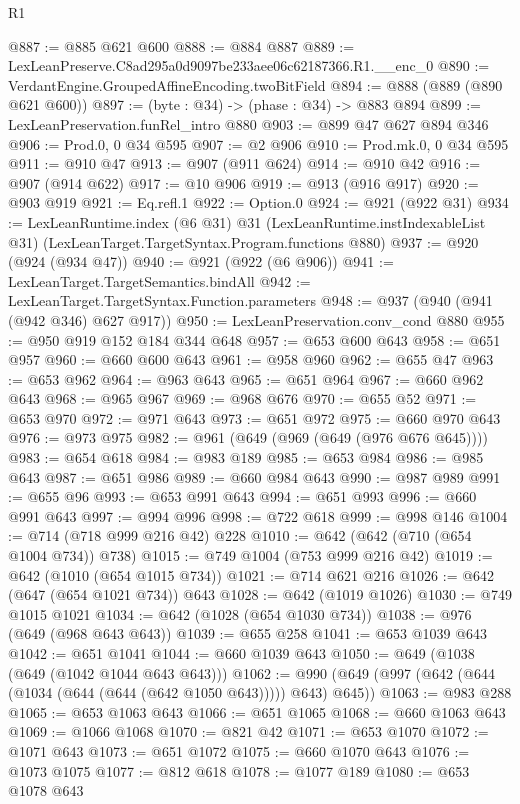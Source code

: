 \begin{lexlean}{R1}
\begin{coremodule}
@887 := @885 @621 @600
@888 := @884 @887
@889 := LexLeanPreserve.C8ad295a0d9097be233aee06c62187366.R1.__enc_0
@890 := VerdantEngine.GroupedAffineEncoding.twoBitField
@894 := @888 (@889 (@890 @621 @600))
@897 := (byte : @34) -> (phase : @34) -> @883 @894
@899 := LexLeanPreservation.funRel_intro @880
@903 := @899 @47 @627 @894 @346
@906 := Prod.{0, 0} @34 @595
@907 := @2 @906
@910 := Prod.mk.{0, 0} @34 @595
@911 := @910 @47
@913 := @907 (@911 @624)
@914 := @910 @42
@916 := @907 (@914 @622)
@917 := @10 @906
@919 := @913 (@916 @917)
@920 := @903 @919
@921 := Eq.refl.{1}
@922 := Option.{0}
@924 := @921 (@922 @31)
@934 := LexLeanRuntime.index
    (@6 @31)
    @31
    (LexLeanRuntime.instIndexableList @31)
    (LexLeanTarget.TargetSyntax.Program.functions @880)
@937 := @920 (@924 (@934 @47))
@940 := @921 (@922 (@6 @906))
@941 := LexLeanTarget.TargetSemantics.bindAll
@942 := LexLeanTarget.TargetSyntax.Function.parameters
@948 := @937 (@940 (@941 (@942 @346) @627 @917))
@950 := LexLeanPreservation.conv_cond @880
@955 := @950 @919 @152 @184 @344 @648
@957 := @653 @600 @643
@958 := @651 @957
@960 := @660 @600 @643
@961 := @958 @960
@962 := @655 @47
@963 := @653 @962
@964 := @963 @643
@965 := @651 @964
@967 := @660 @962 @643
@968 := @965 @967
@969 := @968 @676
@970 := @655 @52
@971 := @653 @970
@972 := @971 @643
@973 := @651 @972
@975 := @660 @970 @643
@976 := @973 @975
@982 := @961 (@649 (@969 (@649 (@976 @676 @645))))
@983 := @654 @618
@984 := @983 @189
@985 := @653 @984
@986 := @985 @643
@987 := @651 @986
@989 := @660 @984 @643
@990 := @987 @989
@991 := @655 @96
@993 := @653 @991 @643
@994 := @651 @993
@996 := @660 @991 @643
@997 := @994 @996
@998 := @722 @618
@999 := @998 @146
@1004 := @714 (@718 @999 @216 @42) @228
@1010 := @642 (@642 (@710 (@654 @1004 @734)) @738)
@1015 := @749 @1004 (@753 @999 @216 @42)
@1019 := @642 (@1010 (@654 @1015 @734))
@1021 := @714 @621 @216
@1026 := @642 (@647 (@654 @1021 @734)) @643
@1028 := @642 (@1019 @1026)
@1030 := @749 @1015 @1021
@1034 := @642 (@1028 (@654 @1030 @734))
@1038 := @976 (@649 (@968 @643 @643))
@1039 := @655 @258
@1041 := @653 @1039 @643
@1042 := @651 @1041
@1044 := @660 @1039 @643
@1050 := @649 (@1038 (@649 (@1042 @1044 @643 @643)))
@1062 := @990 (@649 (@997 (@642 (@644 (@1034 (@644 (@644 (@642 @1050 @643))))) @643) @645))
@1063 := @983 @288
@1065 := @653 @1063 @643
@1066 := @651 @1065
@1068 := @660 @1063 @643
@1069 := @1066 @1068
@1070 := @821 @42
@1071 := @653 @1070
@1072 := @1071 @643
@1073 := @651 @1072
@1075 := @660 @1070 @643
@1076 := @1073 @1075
@1077 := @812 @618
@1078 := @1077 @189
@1080 := @653 @1078 @643

\end{coremodule}
\end{lexlean}

